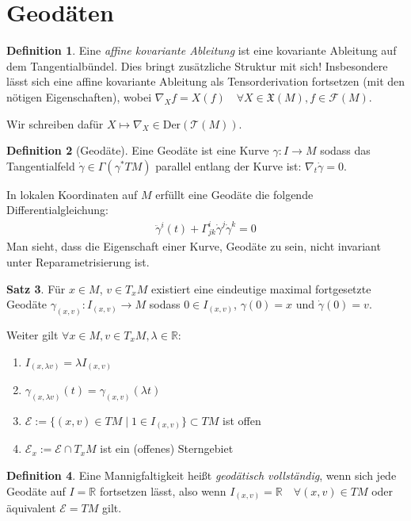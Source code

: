 \documentclass[a4paper]{scrreprt}
\numberwithin{equation}{chapter}
\newcommand{\R}{\mathbb{R}}
\newcommand{\sm}{\mathcal{F}}
\newcommand{\vf}{\mathfrak{X}}
\theoremstyle{definition}
\newtheorem{defn}{Definition}[section]
\newtheorem{satz}[defn]{Satz}
\begin{document}
	\section{Geodäten}
		\begin{defn}
			Eine \emph{affine kovariante Ableitung} ist eine kovariante Ableitung auf dem Tangentialbündel. Dies bringt zusätzliche Struktur mit sich! Insbesondere lässt sich eine affine kovariante Ableitung als Tensorderivation fortsetzen (mit den nötigen Eigenschaften), wobei $\nabla_Xf=X(f) \quad\forall X\in\vf(M),f\in\sm(M)$.
			
			Wir schreiben dafür $X\mapsto\nabla_X\in \mathrm{Der}(\mathcal{T}(M))$.
		\end{defn}
		\begin{defn}[Geodäte]
			Eine Geodäte ist eine Kurve $\gamma\colon I\rightarrow M$ sodass das Tangentialfeld $\dot{\gamma}\in\Gamma(\gamma^*TM)$ parallel entlang der Kurve ist: $\nabla_{t}\dot{\gamma}=0$.
			
			In lokalen Koordinaten auf $M$ erfüllt eine Geodäte die folgende Differentialgleichung:
			\begin{align*}
				\ddot{\gamma}^i(t)+\Gamma^i_{jk}\dot{\gamma}^j\dot{\gamma}^k=0
			\end{align*}
			Man sieht, dass die Eigenschaft einer Kurve, Geodäte zu sein, nicht invariant unter Reparametrisierung ist.
		\end{defn}
		\begin{satz}
			Für $x\in M$, $v\in T_xM$ existiert eine eindeutige maximal fortgesetzte Geodäte $\gamma_{(x,v)}\colon I_{(x,v)}\rightarrow M$ sodass $0\in I_{(x,v)}$, $\gamma(0)=x$ und $\dot{\gamma}(0)=v$.
			
			Weiter gilt $\forall x\in M, v\in T_xM,\lambda\in \R$:
			\begin{enumerate}[label=\arabic* .]
				\item $I_{(x,\lambda v)}=\lambda I_{(x,v)}$
				\item $\gamma_{(x,\lambda v)}(t)=\gamma_{(x, v)}(\lambda t)$
				\item $\mathcal{E}:=\lbrace (x,v)\in TM\mid 1\in I_{(x,v)}\rbrace\subset TM$ ist offen
				\item $\mathcal{E}_x:=\mathcal{E}\cap T_xM$ ist ein (offenes) Sterngebiet
			\end{enumerate}		 
		\end{satz}
		\begin{defn}
			Eine Mannigfaltigkeit heißt \emph{geodätisch vollständig}, wenn sich jede Geodäte auf $I=\R$ fortsetzen lässt, also wenn $I_{(x,v)}=\R\quad\forall (x,v)\in TM$ oder äquivalent $\mathcal{E}=TM$ gilt.
		\end{defn}
\end{document}
